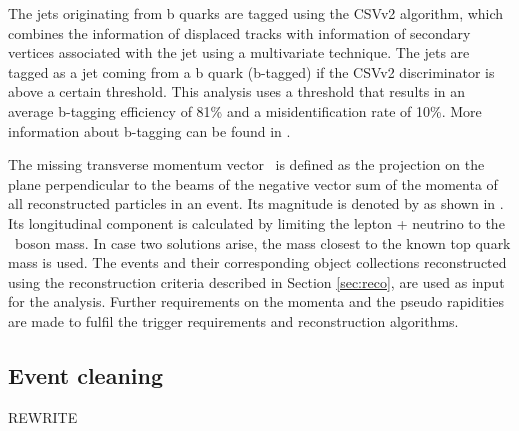 The jets originating from b quarks are tagged using the CSVv2 algorithm, which combines the information of displaced tracks with information of secondary vertices associated with the jet using a multivariate technique. The jets are tagged as a jet coming from a b quark (b-tagged) if the CSVv2 discriminator is above a certain threshold.  This analysis uses a threshold that results in an average b-tagging efficiency of 81\% and a misidentification rate of 10\%. More information about b-tagging can be found in .

The missing transverse momentum vector \ptmisvec\ is defined as the projection on the plane perpendicular to the beams of the negative vector sum of the momenta of all reconstructed particles in an event. Its magnitude is denoted by \Etmis as shown in . Its longitudinal component is calculated by limiting the lepton + neutrino to the \PW\ boson mass. In case two solutions arise, the mass closest to the known top quark mass is used. 
The events and their corresponding object collections reconstructed using the reconstruction criteria described in Section \ref{sec:reco}, are used as input for the analysis. Further requirements on the momenta and the pseudo rapidities are made to fulfil the trigger requirements and reconstruction algorithms. %
\subsection{Event cleaning}
\label{sec:Filters}
REWRITE %

